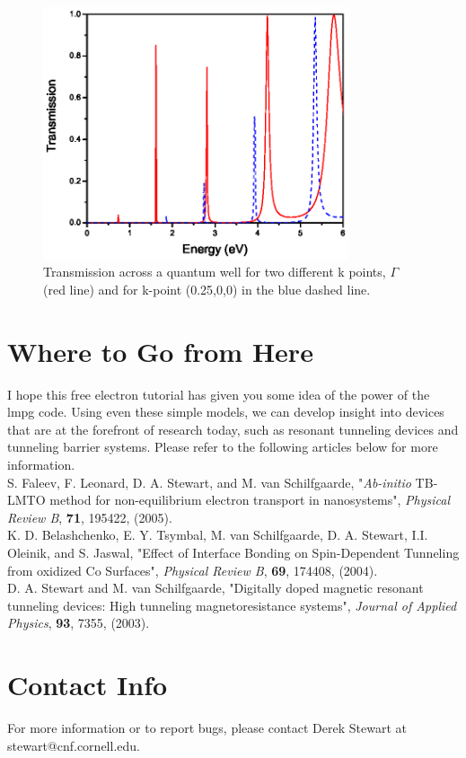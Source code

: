 \documentclass[10pt]{article}
\begin{document}
\begin{figure}
\begin{center}
\centering
\includegraphics[angle=0,width=9.00cm]{jzk.1and2.well.eps}
\caption{Transmission across a quantum well for two different k points, $\Gamma$ (red line) and for k-point (0.25,0,0) in the blue dashed line.}
\label{k_trans_well} 
\end{center}
\end{figure}

\section{Where to Go from Here}
I hope this free electron tutorial has given you some idea of the power of the lmpg code.  Using even these simple models, we can develop insight into devices that are at the forefront of research today, such as resonant tunneling devices and tunneling barrier systems.  Please refer to the following articles below for more information.\\

\noindent S. Faleev, F. Leonard, D. A. Stewart, and M. van Schilfgaarde, "\textit{Ab-initio} TB-LMTO method for non-equilibrium electron transport in nanosystems", \textit{Physical Review B}, \textbf{71}, 195422, (2005). \\

\noindent K. D. Belashchenko, E. Y. Tsymbal, M. van Schilfgaarde, D. A. Stewart, I.I. Oleinik, and S. Jaswal, "Effect of Interface Bonding on Spin-Dependent Tunneling from oxidized Co Surfaces", \textit{Physical Review B}, \textbf{69}, 174408, (2004). \\

\noindent D. A. Stewart and M. van Schilfgaarde, "Digitally doped magnetic resonant tunneling devices: High tunneling magnetoresistance systems", \textit{Journal of Applied Physics}, \textbf{93}, 7355, (2003).

\section{Contact Info}
For more information or to report bugs, please contact Derek Stewart at stewart@cnf.cornell.edu.  

 
\end{document}
